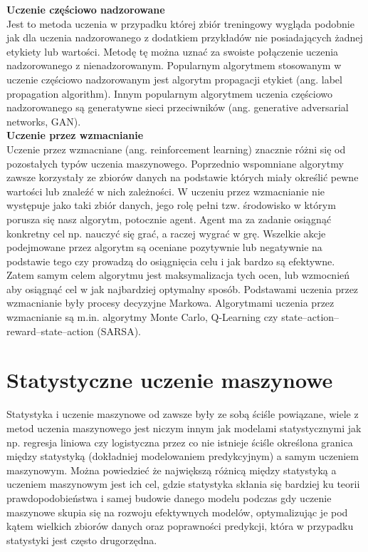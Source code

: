 \documentclass[a4paper,12pt,oneside]{book}
\begin{document}
\textbf{Uczenie częściowo nadzorowane}\\
      Jest to metoda uczenia w przypadku której zbiór treningowy wygląda podobnie jak dla  uczenia nadzorowanego z dodatkiem przykładów nie posiadających żadnej etykiety lub wartości. Metodę tę można uznać za swoiste połączenie uczenia nadzorowanego z nienadzorowanym. Popularnym algorytmem stosowanym w uczenie częściowo nadzorowanym jest algorytm propagacji etykiet (ang. label propagation algorithm). Innym popularnym algorytmem uczenia częściowo nadzorowanego są generatywne sieci przeciwników (ang. generative adversarial networks, GAN).\\

\textbf{Uczenie przez wzmacnianie}\\
      Uczenie przez wzmacniane (ang. reinforcement learning)  znacznie różni się od pozostałych typów uczenia maszynowego. Poprzednio wspomniane algorytmy zawsze korzystały ze zbiorów danych na podstawie których miały określić pewne wartości lub znaleźć w nich zależności. W uczeniu przez wzmacnianie nie występuje jako taki zbiór danych, jego rolę pełni tzw. środowisko w którym porusza się nasz algorytm, potocznie agent. Agent ma za zadanie osiągnąć konkretny cel np. nauczyć się grać, a raczej wygrać w grę. Wszelkie akcje podejmowane przez algorytm są oceniane pozytywnie lub negatywnie na podstawie tego czy prowadzą do osiągnięcia celu i jak bardzo są efektywne. Zatem samym celem algorytmu jest maksymalizacja tych ocen, lub wzmocnień aby osiągnąć cel w jak najbardziej optymalny sposób. Podstawami uczenia przez wzmacnianie były procesy decyzyjne Markowa. Algorytmami uczenia przez wzmacnianie są m.in. algorytmy Monte Carlo, Q-Learning czy state–action–reward–state–action  (SARSA).\\

\section{Statystyczne uczenie maszynowe}
Statystyka i uczenie maszynowe od zawsze były ze sobą ściśle powiązane, wiele z metod uczenia maszynowego jest niczym innym jak modelami statystycznymi jak np. regresja liniowa czy logistyczna przez co nie istnieje ściśle określona granica między statystyką (dokładniej modelowaniem predykcyjnym) a samym uczeniem maszynowym. Można powiedzieć że największą różnicą między statystyką a uczeniem maszynowym jest ich cel, gdzie statystyka skłania się bardziej ku teorii prawdopodobieństwa i samej budowie danego modelu podczas gdy uczenie maszynowe skupia się na rozwoju efektywnych modelów, optymalizując je pod kątem wielkich zbiorów danych oraz poprawności predykcji, która w przypadku statystyki jest często drugorzędna.
\end{document}

